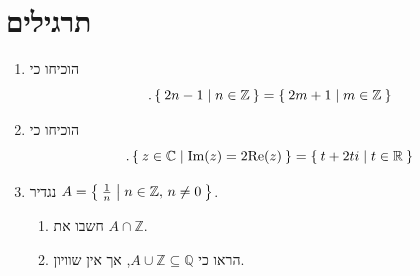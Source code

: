 \documentclass[12pt]{book}
\theoremstyle{plain}
\theoremstyle{definition}
\newcommand{\R}{\mathbb R}
\newcommand{\Z}{\mathbb Z}
\newcommand{\Q}{\mathbb Q}
\newcommand{\C}{\mathbb C}
\begin{document}
\section{תרגילים}
\begin{enumerate}
\item הוכיחו כי
$$
.\Set{2n-1|n\in\Z}=\Set{2m+1|m\in\Z}
$$
\item הוכיחו כי
$$
.\Set{z\in\C|\text{{Im}}(z)=2\text{{Re}}(z)}=\Set{t+2ti|t\in\R}
$$
\item נגדיר $A=\Set{\frac{1}{n}|n\in\Z,\,n\neq0}$. 
\begin{enumerate}
\item חשבו את $A\cap\Z$.
\item הראו כי $A\cup\Z\subseteq\Q$, אך
אין שוויון.
\end{enumerate}
\end{enumerate}

\backmatter
\end{document}
